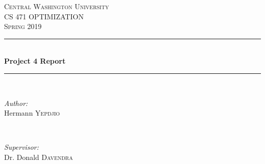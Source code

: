 \documentclass[12pt]{article}
\begin{document}
	
	\begin{titlepage}
		
		\newcommand{\HRule}{\rule{\linewidth}{0.5mm}} %
		
		\center %
		
		
		\textsc{\LARGE Central Washington University}\\[1.5cm] %
		\textsc{\Large CS 471 OPTIMIZATION}\\[0.5cm] %
		\textsc{\large Spring 2019}\\[0.5cm] %
		
		
		\HRule \\[0.4cm]
		{ \huge \bfseries Project 4 Report}\\[0.4cm] %
		\HRule \\[1.5cm]
		
		
		\begin{minipage}{0.4\textwidth}
			\begin{flushleft} \large
				\emph{Author:}\\
				Hermann \textsc{Yepdjio} %
			\end{flushleft}
		\end{minipage}
		~
		\begin{minipage}{0.4\textwidth}
			\begin{flushright} \large
				\emph{Supervisor:} \\
				Dr. Donald \textsc{Davendra} %
			\end{flushright}
		\end{minipage}\\[1cm]
		

\end{titlepage}
\end{document}
